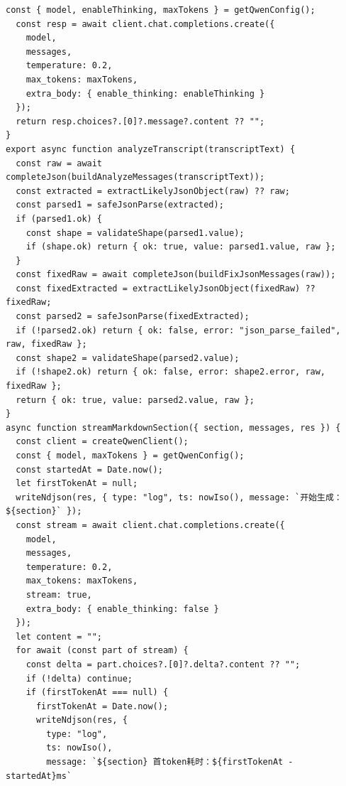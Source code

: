 \documentclass[12pt,a4paper]{article}
\begin{document}
\begin{Verbatim}[fontsize=\footnotesize]
  const { model, enableThinking, maxTokens } = getQwenConfig();
  const resp = await client.chat.completions.create({
    model,
    messages,
    temperature: 0.2,
    max_tokens: maxTokens,
    extra_body: { enable_thinking: enableThinking }
  });
  return resp.choices?.[0]?.message?.content ?? "";
}
export async function analyzeTranscript(transcriptText) {
  const raw = await completeJson(buildAnalyzeMessages(transcriptText));
  const extracted = extractLikelyJsonObject(raw) ?? raw;
  const parsed1 = safeJsonParse(extracted);
  if (parsed1.ok) {
    const shape = validateShape(parsed1.value);
    if (shape.ok) return { ok: true, value: parsed1.value, raw };
  }
  const fixedRaw = await completeJson(buildFixJsonMessages(raw));
  const fixedExtracted = extractLikelyJsonObject(fixedRaw) ?? fixedRaw;
  const parsed2 = safeJsonParse(fixedExtracted);
  if (!parsed2.ok) return { ok: false, error: "json_parse_failed", raw, fixedRaw };
  const shape2 = validateShape(parsed2.value);
  if (!shape2.ok) return { ok: false, error: shape2.error, raw, fixedRaw };
  return { ok: true, value: parsed2.value, raw };
}
async function streamMarkdownSection({ section, messages, res }) {
  const client = createQwenClient();
  const { model, maxTokens } = getQwenConfig();
  const startedAt = Date.now();
  let firstTokenAt = null;
  writeNdjson(res, { type: "log", ts: nowIso(), message: `开始生成：${section}` });
  const stream = await client.chat.completions.create({
    model,
    messages,
    temperature: 0.2,
    max_tokens: maxTokens,
    stream: true,
    extra_body: { enable_thinking: false }
  });
  let content = "";
  for await (const part of stream) {
    const delta = part.choices?.[0]?.delta?.content ?? "";
    if (!delta) continue;
    if (firstTokenAt === null) {
      firstTokenAt = Date.now();
      writeNdjson(res, {
        type: "log",
        ts: nowIso(),
        message: `${section} 首token耗时：${firstTokenAt - startedAt}ms`
\end{Verbatim}
\newpage
{}
\fancyhead[R]{}
\end{document}
